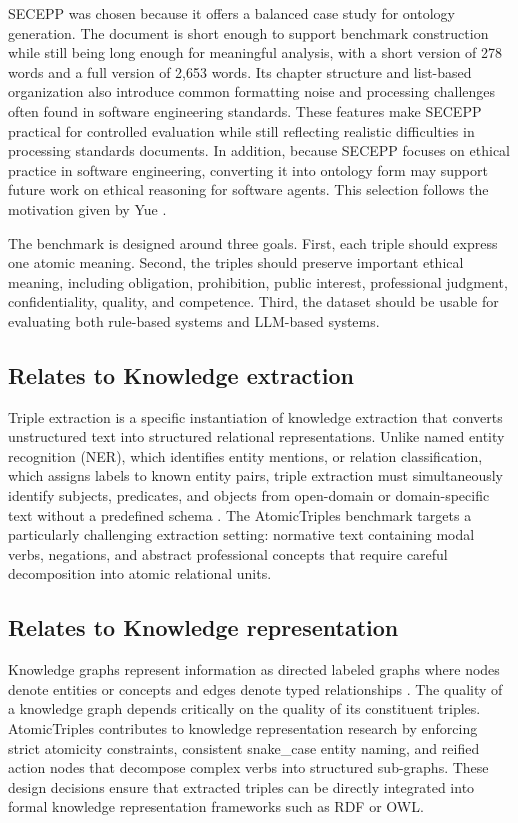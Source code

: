 \documentclass[conference]{IEEEtran}
\begin{document}
SECEPP was chosen because it offers a balanced case study for ontology generation. The document is short enough to support benchmark construction while still being long enough for meaningful analysis, with a short version of 278 words and a full version of 2,653 words. Its chapter structure and list-based organization also introduce common formatting noise and processing challenges often found in software engineering standards. These features make SECEPP practical for controlled evaluation while still reflecting realistic difficulties in processing standards documents. In addition, because SECEPP focuses on ethical practice in software engineering, converting it into ontology form may support future work on ethical reasoning for software agents. This selection follows the motivation given by Yue \cite{yue2026llmrte}.

The benchmark is designed around three goals. First, each triple should express one atomic meaning. Second, the triples should preserve important ethical meaning, including obligation, prohibition, public interest, professional judgment, confidentiality, quality, and competence. Third, the dataset should be usable for evaluating both rule-based systems and LLM-based systems.

\subsection{Relates to Knowledge extraction}
Triple extraction is a specific instantiation of knowledge extraction that converts unstructured text into structured relational representations. Unlike named entity recognition (NER), which identifies entity mentions, or relation classification, which assigns labels to known entity pairs, triple extraction must simultaneously identify subjects, predicates, and objects from open-domain or domain-specific text without a predefined schema \cite{angeli2015leveraging}. The AtomicTriples benchmark targets a particularly challenging extraction setting: normative text containing modal verbs, negations, and abstract professional concepts that require careful decomposition into atomic relational units.

\subsection{Relates to Knowledge representation}
Knowledge graphs represent information as directed labeled graphs where nodes denote entities or concepts and edges denote typed relationships \cite{hogan2021knowledge}. The quality of a knowledge graph depends critically on the quality of its constituent triples. AtomicTriples contributes to knowledge representation research by enforcing strict atomicity constraints, consistent snake\_case entity naming, and reified action nodes that decompose complex verbs into structured sub-graphs. These design decisions ensure that extracted triples can be directly integrated into formal knowledge representation frameworks such as RDF or OWL.
\end{document}
